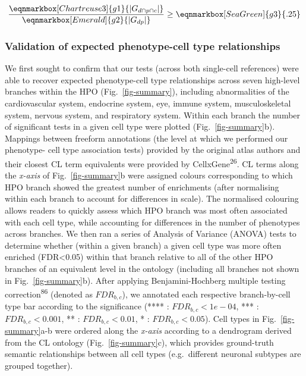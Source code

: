\documentclass[
]{article}
\begin{document}
\hfill\break

\begin{equation*}
  \frac{
     \eqnmarkbox[Chartreuse3]{g1}{|G_{d \cap p \cap c} |}
    }{
       \eqnmarkbox[Emerald]{g2}{|G_{dp}|}} 
  \geq \eqnmarkbox[SeaGreen]{g3}{.25} 
\end{equation*}

\hfill\break
\hfill\break

\subsubsection{Validation of expected phenotype-cell type
relationships}\label{validation-of-expected-phenotype-cell-type-relationships-1}

We first sought to confirm that our tests (across both single-cell
references) were able to recover expected phenotype-cell type
relationships across seven high-level branches within the HPO
(Fig.~\ref{fig-summary}), including abnormalities of the cardiovascular
system, endocrine system, eye, immune system, musculoskeletal system,
nervous system, and respiratory system. Within each branch the number of
significant tests in a given cell type were plotted
(Fig.~\ref{fig-summary}b). Mappings between freeform annotations (the
level at which we performed our phenotype- cell type association tests)
provided by the original atlas authors and their closest CL term
equivalents were provided by CellxGene\textsuperscript{26}. CL terms
along the \emph{x-axis} of Fig.~\ref{fig-summary}b were assigned colours
corresponding to which HPO branch showed the greatest number of
enrichments (after normalising within each branch to account for
differences in scale). The normalised colouring allows readers to
quickly assess which HPO branch was most often associated with each cell
type, while accounting for differences in the number of phenotypes
across branches. We then ran a series of Analysis of Variance (ANOVA)
tests to determine whether (within a given branch) a given cell type was
more often enriched (FDR\textless0.05) within that branch relative to
all of the other HPO branches of an equivalent level in the ontology
(including all branches not shown in Fig.~\ref{fig-summary}b). After
applying Benjamini-Hochberg multiple testing
correction\textsuperscript{86} (denoted as \(FDR _{b,c}\)), we annotated
each respective branch-by-cell type bar according to the significance
(**** : \(FDR _{b,c}<1e-04\), *** : \(FDR _{b,c}<0.001\), ** :
\(FDR _{b,c}<0.01\), * : \(FDR _{b,c}<0.05\)). Cell types in
Fig.~\ref{fig-summary}a-b were ordered along the \emph{x-axis} according
to a dendrogram derived from the CL ontology (Fig.~\ref{fig-summary}c),
which provides ground-truth semantic relationships between all cell
types (e.g.~different neuronal subtypes are grouped together).
\end{document}
